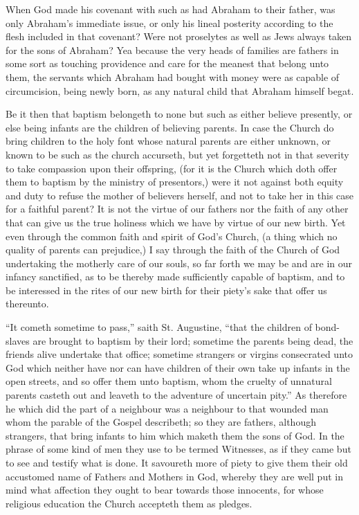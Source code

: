 When God made his covenant with such as had Abraham to their father, was only Abraham’s immediate issue, or only his lineal posterity according to the flesh included in that covenant? Were not proselytes as well as Jews always taken for the sons of Abraham? Yea because the very heads of families are fathers in some sort as touching providence and care for the meanest that belong unto them, the servants which Abraham had bought with money were as capable of  circumcision, being newly born, as any natural child that Abraham himself begat.

Be it then that baptism belongeth to none but such as either believe presently, or else being infants are the children of believing parents. In case the Church do bring children to the holy font whose natural parents are either unknown, or known to be such as the church accurseth, but yet forgetteth not in that severity to take compassion upon their offspring, (for it is the Church which doth offer them to baptism by the ministry of presentors,) were it not against both equity and duty to refuse the mother of believers herself, and not to take her in this case for a faithful parent? It is not the virtue of our fathers nor the faith of any other that can give us the true holiness which we have by virtue of our new birth. Yet even through the common faith and spirit of God’s Church, (a thing which no quality of parents can prejudice,) I say through the faith of the Church of God undertaking the motherly care of our souls, so far forth we may be and are in our infancy sanctified, as to be thereby made sufficiently capable of baptism, and to be interessed in the rites of our new birth for their piety’s sake that offer us thereunto.

“It cometh sometime to pass,” saith St. Augustine, “that the children of bond-slaves are brought to baptism by their  lord;
 sometime the parents being dead, the friends alive undertake that office; sometime strangers or virgins consecrated unto God which neither have nor can have children of their own take up infants in the open streets, and so offer them unto baptism, whom the cruelty of unnatural parents casteth out and leaveth to the adventure of uncertain pity.” As therefore he which did the part of a neighbour was a neighbour to that wounded man whom the parable of the Gospel describeth; so they are fathers, although strangers, that bring infants to him which maketh them the sons of God. In the phrase of some kind of men they use to be termed Witnesses, as if they came but to see and testify what is done. It savoureth more of piety to give them their old accustomed name of Fathers and Mothers in God, whereby they are well put in mind what affection they ought to bear towards those innocents, for whose religious education the Church accepteth them as pledges.

